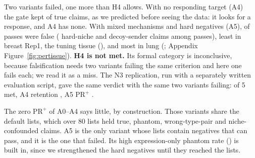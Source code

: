 \documentclass[letterpaper]{article} %
\begin{document}
Two variants failed, one more than H4 allows. With no responding target (A4) the gate kept \hfourAfourRet{}
\hfourAfourRetci{} of true claims, as we predicted before seeing the data: it looks for a response, and A4 has none.
With mixed mechanisms and hard negatives (A5), \hfourAfivePRafter{} \hfourAfivePRafterci{} of passes were false
(\hfourAfiveFalseNiche{} hard-niche and \hfourAfiveFalseDecoy{} decoy-sender claims among \hfourAfiveNpass{} passes),
least in breast Rep1, the tuning tissue (\hfourAfivePRafterBreastRepone{}), and most in lung
(\hfourAfivePRafterLung{}; Appendix Figure~\ref{fig:pertissue}). \textbf{H4 is not met.} Its formal category is
inconclusive, because falsification needs two variants failing the same criterion and here one fails each; we read it
as a miss. The N3 replication, run with a separately written evaluation script, gave the same verdict with the same two
variants failing: \hfourNthreeNmet{} of 5 met, A4 retention \hfourNthreeAfourRet{}, A5 $\mathrm{PR}^{+}$
\hfourNthreeAfivePRafter{} \hfourNthreeAfivePRafterci{}.

The zero $\mathrm{PR}^{+}$ of A0--A4 says little, by construction. Those variants share the default lists, which over
80 lists held \hfourCompAzeroTrue{} true, \hfourCompAzeroPhantom{} phantom, \hfourCompAzeroOther{} wrong-type-pair and
\hfourCompAzeroNiche{} niche-confounded claims. A5 is the only variant whose lists contain negatives that can pass, and
it is the one that failed. Its high expression-only phantom rate (\hfourAfivePR{}) is built in, since we strengthened
the hard negatives until they reached the lists.
\end{document}

